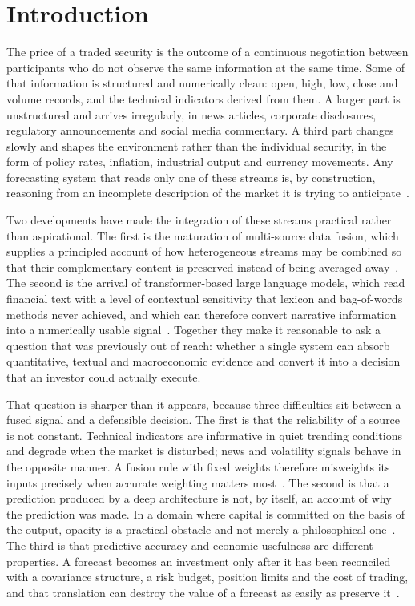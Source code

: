 \chapter{Introduction}

The price of a traded security is the outcome of a continuous negotiation between
participants who do not observe the same information at the same time. Some of that
information is structured and numerically clean: open, high, low, close and volume
records, and the technical indicators derived from them. A larger part is unstructured
and arrives irregularly, in news articles, corporate disclosures, regulatory
announcements and social media commentary. A third part changes slowly and shapes the
environment rather than the individual security, in the form of policy rates, inflation,
industrial output and currency movements. Any forecasting system that reads only one of
these streams is, by construction, reasoning from an incomplete description of the
market it is trying to anticipate~\cite{snasel2024,long2024}.

Two developments have made the integration of these streams practical rather than
aspirational. The first is the maturation of multi-source data fusion, which supplies a
principled account of how heterogeneous streams may be combined so that their
complementary content is preserved instead of being averaged away~\cite{snasel2024,
zhang2022fusion}. The second is the arrival of transformer-based large language models,
which read financial text with a level of contextual sensitivity that lexicon and
bag-of-words methods never achieved, and which can therefore convert narrative
information into a numerically usable signal~\cite{vaswani2017,araci2019,li2024llmsurvey}.
Together they make it reasonable to ask a question that was previously out of reach:
whether a single system can absorb quantitative, textual and macroeconomic evidence and
convert it into a decision that an investor could actually execute.

That question is sharper than it appears, because three difficulties sit between a
fused signal and a defensible decision. The first is that the reliability of a source is
not constant. Technical indicators are informative in quiet trending conditions and
degrade when the market is disturbed; news and volatility signals behave in the opposite
manner. A fusion rule with fixed weights therefore misweights its inputs precisely when
accurate weighting matters most~\cite{farimani2024,tai2022}. The second is that a
prediction produced by a deep architecture is not, by itself, an account of why the
prediction was made. In a domain where capital is committed on the basis of the output,
opacity is a practical obstacle and not merely a philosophical one~\cite{koa2024,
lundberg2017}. The third is that predictive accuracy and economic usefulness are
different properties. A forecast becomes an investment only after it has been reconciled
with a covariance structure, a risk budget, position limits and the cost of trading, and
that translation can destroy the value of a forecast as easily as preserve
it~\cite{demiguel2009,gu2020}.

